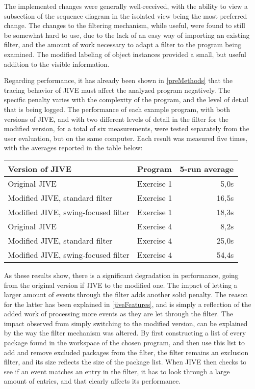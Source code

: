 The implemented changes were generally well-received, with the ability to view a subsection of the sequence diagram in the isolated view being the most preferred change.
The changes to the filtering mechanism, while useful, were found to still be somewhat hard to use, due to the lack of an easy way of importing an existing filter, and the amount of work necessary to adapt a filter to the program being examined.
The modified labeling of object instances provided a small, but useful addition to the visible information.

Regarding performance, it has already been shown in \autoref{preMethods} that the tracing behavior of JIVE must affect the analyzed program negatively.
The specific penalty varies with the complexity of the program, and the level of detail that is being logged.
The performance of each example program, with both versions of JIVE, and with two different levels of detail in the filter for the modified version, for a total of six measurements, were tested separately from the user evaluation, but on the same computer.
Each result was measured five times, with the averages reported in the table below:

\begin{center}
	\begin{tabular}{|l|l|r|}
		\hline
		Version of JIVE & Program & 5-run average\\ \hline
		Original JIVE & Exercise 1 & 5,0s\\ \hline	
		Modified JIVE, standard filter & Exercise 1 & 16,5s\\ \hline	
		Modified JIVE, swing-focused filter & Exercise 1 & 18,3s\\ \hline
		Original JIVE & Exercise 4 & 8,2s\\ \hline	
		Modified JIVE, standard filter & Exercise 4 & 25,0s\\ \hline	
		Modified JIVE, swing-focused filter & Exercise 4 & 54,4s\\ \hline
	\end{tabular}
\end{center}

As these results show, there is a significant degradation in performance, going from the original version if JIVE to the modified one.
The impact of letting a larger amount of events through the filter adds another solid penalty.
The reason for the latter has been explained in \autoref{jiveFeatures}, and is simply a reflection of the added work of processing more events as they are let through the filter.
The impact observed from simply switching to the modified version, can be explained by the way the filter mechanism was altered.
By first constructing a list of every package found in the workspace of the chosen program, and then use this list to add and remove excluded packages from the filter, the filter remains an exclusion filter, and its size reflects the size of the package list.
When JIVE then checks to see if an event matches an entry in the filter, it has to look through a large amount of entries, and that clearly affects its performance.

